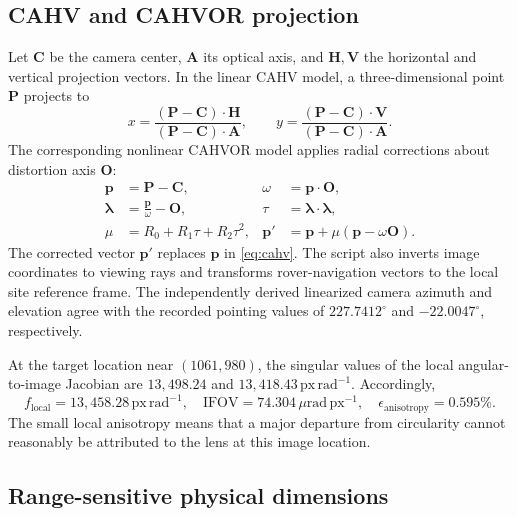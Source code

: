 \documentclass[11pt,letterpaper]{article}
\newcommand{\mat}[1]{\mathbf{#1}}
\begin{document}
\subsection{CAHV and CAHVOR projection}

Let \(\mat C\) be the camera center, \(\mat A\) its optical axis, and \(\mat H,\mat V\) the horizontal and vertical projection vectors. In the linear CAHV model, a three-dimensional point \(\mat P\) projects to
\begin{equation}
 x=\frac{(\mat P-\mat C)\cdot\mat H}{(\mat P-\mat C)\cdot\mat A},\qquad
 y=\frac{(\mat P-\mat C)\cdot\mat V}{(\mat P-\mat C)\cdot\mat A}.
 \label{eq:cahv}
\end{equation}
The corresponding nonlinear CAHVOR model applies radial corrections about distortion axis \(\mat O\):
\begin{align}
\mat p&=\mat P-\mat C, & \omega&=\mat p\cdot\mat O, \\
\boldsymbol{\lambda}&=\frac{\mat p}{\omega}-\mat O, & \tau&=\boldsymbol{\lambda}\cdot\boldsymbol{\lambda},\\
\mu&=R_0+R_1\tau+R_2\tau^2, &
\mat p'&=\mat p+\mu(\mat p-\omega\mat O).
\end{align}
The corrected vector \(\mat p'\) replaces \(\mat p\) in \cref{eq:cahv}. The script also inverts image coordinates to viewing rays and transforms rover-navigation vectors to the local site reference frame. The independently derived linearized camera azimuth and elevation agree with the recorded pointing values of \(227.7412^\circ\) and \(-22.0047^\circ\), respectively.

At the target location near \((1061,980)\), the singular values of the local angular-to-image Jacobian are \(13{,}498.24\) and \(13{,}418.43\,\mathrm{px\,rad^{-1}}\). Accordingly,
\begin{equation}
 f_{\mathrm{local}}=13{,}458.28\,\mathrm{px\,rad^{-1}},\quad
 \mathrm{IFOV}=74.304\,\mu\mathrm{rad\,px^{-1}},\quad
 \epsilon_{\mathrm{anisotropy}}=0.595\%.
\end{equation}
The small local anisotropy means that a major departure from circularity cannot reasonably be attributed to the lens at this image location.

\subsection{Range-sensitive physical dimensions}
\end{document}
